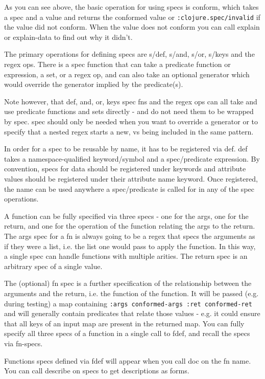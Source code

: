 As you can see above, the basic operation for using specs is conform, which
takes a spec and a value and returns the conformed value or
\texttt{:clojure.spec/invalid} if the value did not conform. When the value does
not conform you can call explain or explain-data to find out why it didn’t.

The primary operations for defining specs are s/def, s/and, s/or, s/keys and the
regex ops. There is a spec function that can take a predicate function or
expression, a set, or a regex op, and can also take an optional generator which
would override the generator implied by the predicate(s).

Note however, that def, and, or, keys spec fns and the regex ops can all take
and use predicate functions and sets directly - and do not need them to be
wrapped by spec. spec should only be needed when you want to override a
generator or to specify that a nested regex starts a new, vs being included in
the same pattern.

In order for a spec to be reusable by name, it has to be registered via def. def
takes a namespace-qualified keyword/symbol and a spec/predicate expression. By
convention, specs for data should be registered under keywords and attribute
values should be registered under their attribute name keyword. Once registered,
the name can be used anywhere a spec/predicate is called for in any of the spec
operations.

A function can be fully specified via three specs - one for the args, one for
the return, and one for the operation of the function relating the args to the
return. The args spec for a fn is always going to be a regex that specs the
arguments as if they were a list, i.e. the list one would pass to apply the
function. In this way, a single spec can handle functions with multiple arities.
The return spec is an arbitrary spec of a single value.

The (optional) fn spec is a further specification of the relationship between
the arguments and the return, i.e. the function of the function. It will be
passed (e.g. during testing) a map containing\newline
\texttt{{:args conformed-args :ret conformed-ret}} and will
generally contain predicates that relate those values - e.g. it could ensure
that all keys of an input map are present in the returned map. You can fully
specify all three specs of a function in a single call to fdef, and recall the
specs via fn-specs.

Functions specs defined via fdef will appear when you call doc on the fn name.
You can call describe on specs to get descriptions as forms.

